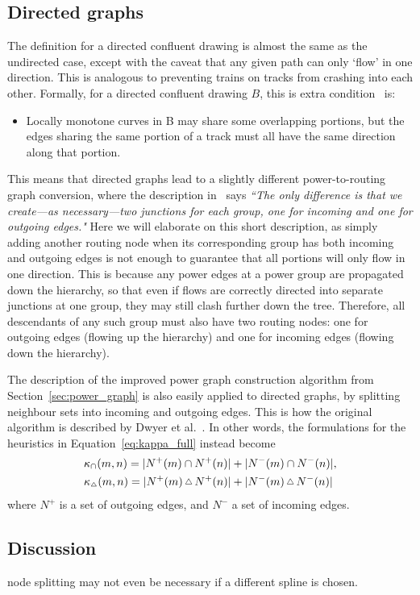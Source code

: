 \subsection{Directed graphs}
\label{sec:power_directed}
The definition for a directed confluent drawing is almost the same as the undirected case, except with the caveat that any given path can only `flow' in one direction. This is analogous to preventing trains on tracks from crashing into each other. 
Formally, for a directed confluent drawing $B$, this is extra condition~\cite{Dickerson2005} is:
\begin{itemize}
    \item Locally monotone curves in B may share some overlapping portions, but the edges sharing the same portion of a track must all have the same direction along that portion.
\end{itemize}
This means that directed graphs lead to a slightly different power-to-routing graph conversion, where the description in~\cite{Bach2017} says \emph{``The only difference is that we create---as necessary---two junctions for each group, one for incoming and one for outgoing edges."}
Here we will elaborate on this short description, as simply adding another routing node when its corresponding group has both incoming and outgoing edges is not enough to guarantee that all portions will only flow in one direction.
This is because any power edges at a power group are propagated down the hierarchy, so that even if flows are correctly directed into separate junctions at one group, they may still clash further down the tree.
Therefore, all descendants of any such group must also have two routing nodes: one for outgoing edges (flowing up the hierarchy) and one for incoming edges (flowing down the hierarchy).

The description of the improved power graph construction algorithm from Section~\ref{sec:power_graph} is also easily applied to directed graphs, by splitting neighbour sets into incoming and outgoing edges. This is how the original algorithm is described by Dwyer et al.~\cite{Dwyer2014}.
In other words, the formulations for the heuristics in Equation~\eqref{eq:kappa_full} instead become
\begin{align}
    &\kappa_\cap(m,n) = |N^+(m)\cap N^+(n)| + |N^-(m)\cap N^-(n)|,\\
    &\kappa_{\Triangle}(m,n) = |N^+(m)\,\Triangle\,N^+(n)| + |N^-(m)\,\Triangle\,N^-(n)|
\end{align}
where $N^+$ is a set of outgoing edges, and $N^-$ a set of incoming edges.

\subsection{Discussion}
node splitting may not even be necessary if a different spline is chosen.
